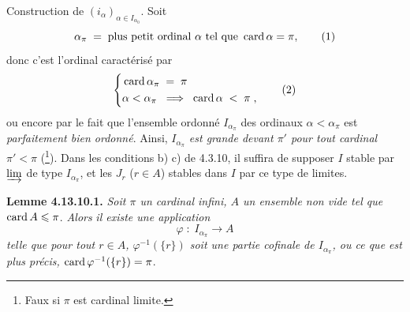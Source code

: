 Construction de $(i_\alpha)_{\alpha\in I_{\alpha_0}}$. Soit %
\[ \alpha_\pi \; = \; \text{plus petit ordinal } \alpha \text{ tel que } \operatorname{card}\alpha=\pi, \tag*{(1)} \]
donc c'est l'ordinal caractérisé par
\[ \left\{
\begin{aligned}
&\operatorname{card}\alpha_\pi \; = \; \pi \\
&\alpha<\alpha_\pi \;\; \Longrightarrow \;\; \operatorname{card}\alpha \; < \; \pi \; ,
\end{aligned}
\right. \tag*{(2)} \]
ou encore par le fait que l'ensemble ordonné $I_{\alpha_\pi}$ des ordinaux $\alpha<\alpha_\pi$ est \textit{parfaitement bien ordonné}. Ainsi, $I_{\alpha_\pi}$ \textit{est grande devant $\pi'$ pour tout cardinal $\pi'<\pi$} (\footnote[130]{Faux si $\pi$ est cardinal limite.}). Dans les conditions b) c) de 4.3.10, il suffira de supposer $I$ stable par $\varinjlim$ de type $I_{\alpha_\pi}$, et les $J_r$ ($r\in A$) stables dans $I$ par ce type de limites. %

\textbf{Lemme 4.13.10.1.} \textit{Soit $\pi$ un cardinal infini, $A$ un ensemble non vide tel que} $\operatorname{card} A\leqslant\pi$. \textit{Alors}
\textit{il existe une application}
\[ \varphi \; : \; I_{\alpha_\pi} \longrightarrow A \]
\textit{telle que pour tout $r\in A$, $\varphi^{-1}(\{r\})$ soit une partie cofinale de $I_{\alpha_\pi}$, ou ce que est plus précis,} $\operatorname{card}\varphi^{-1}(\{r\})=\pi$. %

